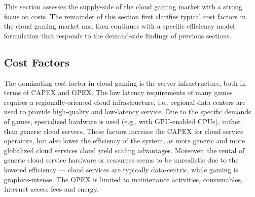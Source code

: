 






This section assesses the supply-side of the cloud gaming market with a strong focus on costs. The remainder of this section first clarifies typical cost factors in the cloud gaming market and then continues with a specific efficiency model formulation that responds to the demand-side findings of previous sections.

\subsection{Cost Factors}

The dominating cost factor in cloud gaming is the server infrastructure, both in terms of \gls{CAPEX} and \gls{OPEX}. The low latency requirements of many games requires a regionally-oriented cloud infrastructure, i.e., regional data centers are used to provide high-quality and low-latency service. Due to the specific demands of games, specialized hardware is used (e.g., with GPU-enabled CPUs), rather than generic cloud servers. These factors increase the \gls{CAPEX} for cloud service operators, but also lower the efficiency of the system, as more generic and more globalized cloud services cloud yield scaling advantages. Moreover, the rental of generic cloud service hardware or resources seems to be unrealistic due to the lowered efficiency --- cloud services are typically data-centric, while gaming is graphics-intense. The \gls{OPEX} is limited to maintenance activities, consumables, Internet access fees and energy.

